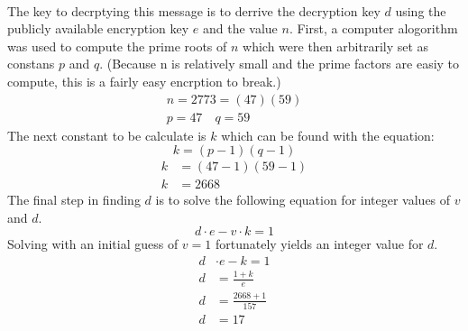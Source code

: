 \documentclass[11pt]{article}
\begin{document}
\paragraph*{}
The key to decrptying this message is to derrive the decryption key $d$ using the publicly available encryption
key $e$ and the value $n$. First, a computer alogorithm was used to compute the prime roots of $n$ which were then arbitrarily
set as constans $p$ and $q$. (Because n is relatively small and the prime factors are easiy to compute,
this is a fairly easy encrption to break.)
\begin{gather*}
	n = 2773 = (47)(59) \\
	p = 47 \quad q = 59
\end{gather*}
The next constant to be calculate is $k$ which can be found with the equation:
\begin{equation} \label{k_eqn}
	k = (p-1)(q-1)
\end{equation}
\begin{align*}
	k &= (47-1)(59-1) \\
	k &= 2668
\end{align*}
The final step in finding $d$ is to solve the following equation for integer values of $v$ and $d$.
\begin{equation} \label{euclids_hell}
	d \cdot e - v \cdot k = 1
\end{equation}
Solving with an initial guess of $v=1$ fortunately yields an integer value for $d$.
\begin{align*}
	d &\cdot e - k = 1 \\
	d &= \frac{1 + k}{e} \\
	d &= \frac{2668 + 1}{157} \\
	d &= 17
\end{align*}
\end{document}
